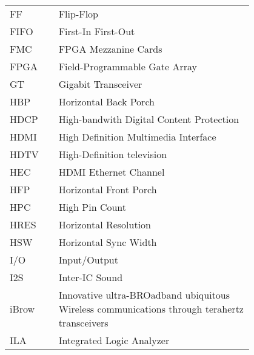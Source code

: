 \begin{flushleft}
\begin{longtable}{l p{0.8\linewidth}}
FF        & Flip-Flop                                                                                    \\
FIFO      & First-In First-Out                                                                           \\
FMC       & FPGA Mezzanine Cards                                                                         \\
FPGA      & Field-Programmable Gate Array                                                                \\
GT        & Gigabit Transceiver                                                                          \\
HBP       & Horizontal Back Porch                                                                        \\
HDCP      & High-bandwith Digital Content Protection                                                     \\
HDMI      & High Definition Multimedia Interface                                                         \\
HDTV      & High-Definition television                                                                   \\
HEC       & HDMI Ethernet Channel                                                                        \\
HFP       & Horizontal Front Porch                                                                       \\
HPC       & High Pin Count                                                                               \\
HRES      & Horizontal Resolution                                                                        \\
HSW       & Horizontal Sync Width                                                                        \\
I/O       & Input/Output                                                                                 \\
I2S       & Inter-IC Sound                                                                               \\
iBrow     & Innovative ultra-BROadband ubiquitous Wireless communications through terahertz transceivers \\
ILA       & Integrated Logic Analyzer                                                                    \\

\end{longtable}
\end{flushleft}

